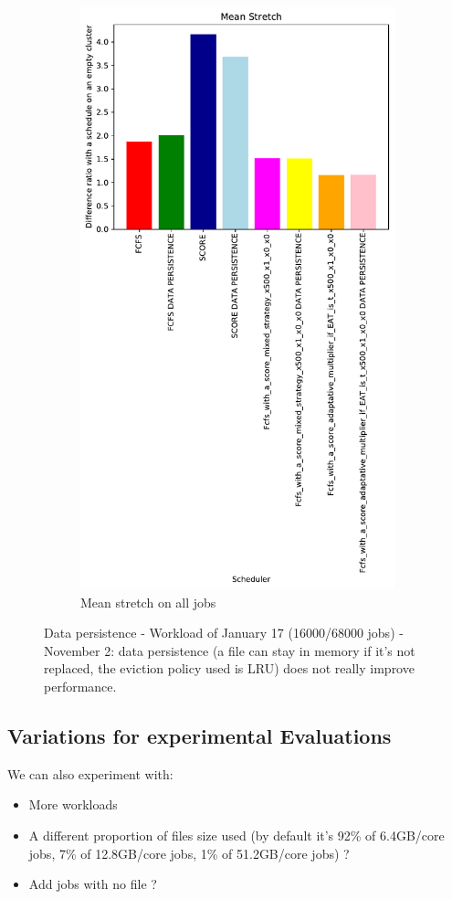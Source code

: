 \documentclass[a4paper]{article}
\begin{document}
\begin{figure}[H]
\begin{subfigure}[b]{0.4\linewidth}\centering\includegraphics[width=0.9\linewidth]{MBSS/plot/Results_Data_Persistence_2022-01-17->2022-01-17_V9271_Mean_Stretch_450_128_32_256_4_1024.pdf}\caption{Mean stretch on all jobs}\end{subfigure}
\caption{Data persistence - Workload of January 17 (16000/68000 jobs) - November 2: data persistence (a file can stay in memory if it's not replaced, the eviction policy used is LRU) does not really improve performance.}\end{figure}

\subsection{Variations for experimental Evaluations}

We can also experiment with:
\begin{itemize}
	\item More workloads
	\item A different proportion of files size used (by default it's 92\% of 6.4GB/core jobs, 7\% of 12.8GB/core jobs, 1\% of 51.2GB/core jobs) ?
	\item Add jobs with no file ?
\end{itemize}
\end{document}
